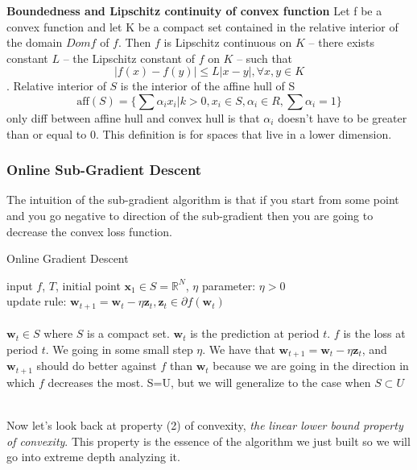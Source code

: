 \documentclass[11pt]{article}
\theoremstyle{quest}
\newcommand{\R}{\mathbb{R}}
\begin{document}
\textbf{Boundedness and Lipschitz continuity of convex function}
Let f be a convex function and let K be a compact set contained in the relative
interior of the domain $Dom f$ of $f$. Then $f$ is Lipschitz continuous on $K$ – there exists
constant $L$ – the Lipschitz constant of $f$ on $K$ – such that
$$|f(x)-f(y)|\le L|x-y|, \forall x, y \in K$$. Relative interior of $S$  is the interior of the affine hull of S 
$$\text{aff}(S)= \{\sum \alpha_i x_i| k>0, x_i \in S, \alpha_i \in R, \sum \alpha_i =1\}$$ only diff between affine hull and convex hull is that $\alpha_i$ doesn't have to be greater than or equal to 0. This definition is for spaces that live in a lower dimension. 

\subsubsection{Online Sub-Gradient Descent}
The intuition of the sub-gradient algorithm is that if you start from some point and you go negative to direction of the sub-gradient then you are going to decrease the convex loss function. 
\begin{tcolorbox}
\begin{center}Online Gradient Descent \end{center}
input $f$, $T$, initial point $\mathbf{x}_1\in S=\R^N$, $\eta$
parameter: $\eta >0$\\
update rule: $\mathbf{w}_{t+1}=\mathbf{w}_{t}-\eta \mathbf{z}_{t}, \mathbf{z}_{t} \in \partial f(\mathbf{w}_t)$ \\ \\ 
$\mathbf{w}_t \in S$ where $S$ is a compact set. $\mathbf{w}_t$ is the prediction at period $t$. $f$ is the loss at period $t$. We going in some small step $\eta$. We have that $\mathbf{w}_{t+1}=\mathbf{w}_{t}-\eta \mathbf{z}_{t}$, and $\mathbf{w}_{t+1}$ should do better against $f$ than $\mathbf{w}_t$ because we are going in the direction in which $f$ decreases the most. S=U, but we will generalize to the case when $S\subset U$ \\  \\
 
\end{tcolorbox}
Now let's look back at property (2) of convexity, \textit{the linear lower bound property of convexity}. This property is the essence of the algorithm we just built so we will go into extreme depth  analyzing it. 
\end{document}
